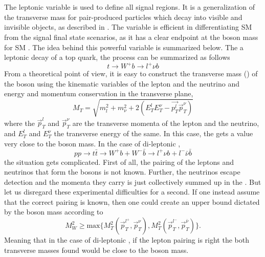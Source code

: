 \section{\mttwo}\label{sec:MT2}
\noindent
\justify
The leptonic \mttwo variable is used to define all signal regions. 
It is a generalization of the transverse mass for pair-produced particles which decay into visible and invisible objects, as described in \cite{Lester:1999tx,Barr_2003}. 
The variable is efficient in differentiating SM \ttbar from the signal final state scenarios, as it has a clear endpoint at the \PW boson mass for SM \ttbar. 
The idea behind this powerful variable is summarized below. 
The a leptonic decay of a top quark, the process can be summarized as follows
\begin{equation}
t\rightarrow W^{+}b \rightarrow l^{+}\nu b 
\end{equation}
From a theoretical point of view, it is easy to construct the transverse mass (\mT) of the \PW boson using the kinematic variables of the lepton and the neutrino and energy and momentum conservation in the transverse plane,
\begin{equation}
M_{T}=\sqrt{m_{l}^{2}+m_{\nu}^{2}+2(E_{T}^{l}E_{T}^{\nu}-\vec{p_{T}^{l}}\vec{p}_{T}^{\nu})}
\end{equation} 
where the $\vec{p}_{T}^{l}$ and $\vec{p}_{T}^{\nu}$ are the transverse momenta of the lepton and the neutrino, and $E_{T}^{l}$ and $E_{T}^{\nu}$ the transverse energy of the same.
In this case, the \mT gets a value very close to the \PW boson mass. 
In the case of di-leptonic \ttbar, 
\begin{equation}
pp\rightarrow t\bar{t}\rightarrow W^{+}b + W^{-}\bar{b}\rightarrow l^{+}\nu b +l^{-}\bar{\nu}\bar{b}
\end{equation}
the situation gets complicated. 
First of all, the pairing of the leptons and neutrinos that form the \PW bosons is not known. 
Further, the neutrinos escape detection and the momenta they carry is just collectively summed up in the \ptmiss. 
But let us disregard these experimental difficulties for a second. 
If one instead assume that the correct pairing is known, then one could create an upper bound dictated by the \PW boson mass according to
\begin{equation}
M_{W}^{2}\geq \mathrm{max}\{M_{T}^{2}\left(\vec{p}_{T}^{l^{+}},\vec{p}_{T}^{\nu}\right), M_{T}^{2}\left(\vec{p}_{T}^{l^{-}},\vec{p}_{T}^{\bar{\nu}}\right)\}.
\end{equation}
Meaning that in the case of di-leptonic \ttbar, if the lepton pairing is right the both transverse masses found would be close to the \PW boson mass. 
